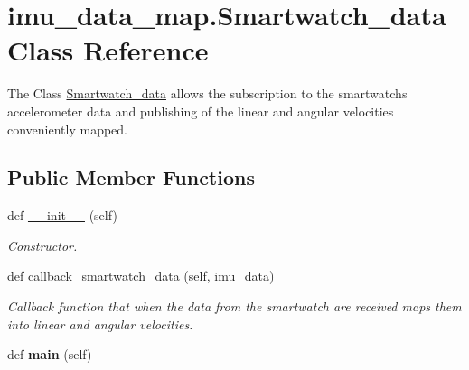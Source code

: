 \hypertarget{classimu__data__map_1_1Smartwatch__data}{}\section{imu\+\_\+data\+\_\+map.\+Smartwatch\+\_\+data Class Reference}
\label{classimu__data__map_1_1Smartwatch__data}


The Class \mbox{\hyperlink{classimu__data__map_1_1Smartwatch__data}{Smartwatch\+\_\+data}} allows the subscription to the smartwatch\textquotesingle{}s accelerometer data and publishing of the linear and angular velocities conveniently mapped.  


\subsection*{Public Member Functions}
\begin{DoxyCompactItemize}
\item 
\mbox{\label{classimu__data__map_1_1Smartwatch__data_a6d7e817bc4eaea9d4362ee8535aa3441}} 
def \mbox{\hyperlink{classimu__data__map_1_1Smartwatch__data_a6d7e817bc4eaea9d4362ee8535aa3441}{\+\_\+\+\_\+init\+\_\+\+\_\+}} (self)
\begin{DoxyCompactList}\small\item\em Constructor. \end{DoxyCompactList}\item 
def \mbox{\hyperlink{classimu__data__map_1_1Smartwatch__data_ae90cc1ac064c75ea42f00bc34b168708}{callback\+\_\+smartwatch\+\_\+data}} (self, imu\+\_\+data)
\begin{DoxyCompactList}\small\item\em Callback function that when the data from the smartwatch are received maps them into linear and angular velocities. \end{DoxyCompactList}\item 
\mbox{\label{classimu__data__map_1_1Smartwatch__data_ab56e26ff9e095e112e4dd199a16b4478}} 
def {\bfseries main} (self)
\end{DoxyCompactItemize}
